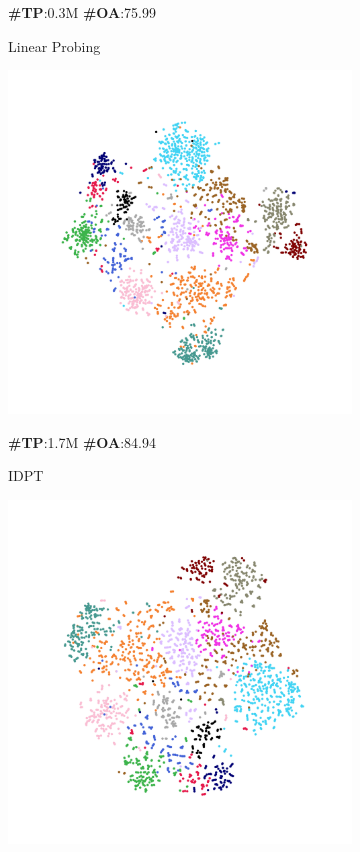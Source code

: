 \begin{figure}
\begin{subfigure}{0.19\textwidth}
        \caption*{\textbf{\#TP}:0.3M \textbf{\#OA}:75.99}
        \caption{Linear Probing}
        \label{fig:sub2}
    \end{subfigure}
    \hfill
    \begin{subfigure}{0.19\textwidth}
        \centering
        \includegraphics[width=\linewidth]{fig/tsne/idpt.pdf}
        \caption*{\textbf{\#TP}:1.7M \textbf{\#OA}:84.94}
        \caption{IDPT}
        \label{fig:sub3}
    \end{subfigure}
    \hfill
    \begin{subfigure}{0.19\textwidth}
        \centering
        \includegraphics[width=\linewidth]{fig/tsne/dapt.pdf}

\end{subfigure}
\end{figure}

